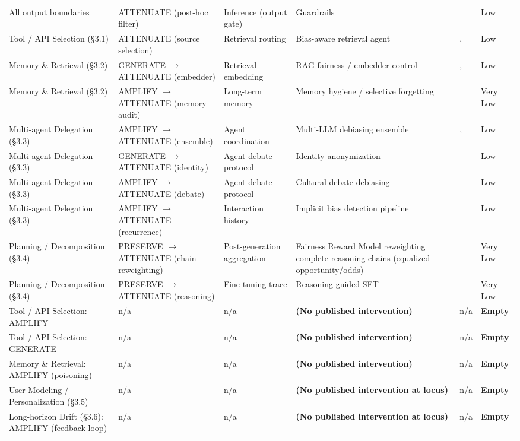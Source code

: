 \documentclass[acmsmall,nonacm]{acmart}
\begin{document}
\begin{longtable}{|p{}|p{}|p{}|p{}|p{}|p{}|}
All output boundaries & ATTENUATE (post-hoc filter) & Inference (output gate) & Guardrails & \cite{dong2024building} & Low \\
Tool / API Selection (\S{}3.1) & ATTENUATE (source selection) & Retrieval routing & Bias-aware retrieval agent & \cite{singh2025bias}, \cite{singh2025biasb} & Low \\
Memory \& Retrieval (\S{}3.2) & GENERATE $\rightarrow$ ATTENUATE (embedder) & Retrieval embedding & RAG fairness / embedder control & \cite{kim2024fair}, \cite{kim2025mitigating} & Low \\
Memory \& Retrieval (\S{}3.2) & AMPLIFY $\rightarrow$ ATTENUATE (memory audit) & Long-term memory & Memory hygiene / selective forgetting & \cite{ma2026implicit} & Very Low \\
Multi-agent Delegation (\S{}3.3) & AMPLIFY $\rightarrow$ ATTENUATE (ensemble) & Agent coordination & Multi-LLM debiasing ensemble & \cite{owens2024multi}, \cite{xu2024mitigating} & Low \\
Multi-agent Delegation (\S{}3.3) & GENERATE $\rightarrow$ ATTENUATE (identity) & Agent debate protocol & Identity anonymization & \cite{choi2025identity} & Low \\
Multi-agent Delegation (\S{}3.3) & AMPLIFY $\rightarrow$ ATTENUATE (debate) & Agent debate protocol & Cultural debate debiasing & \cite{ki2025multiple} & Low \\
Multi-agent Delegation (\S{}3.3) & AMPLIFY $\rightarrow$ ATTENUATE (recurrence) & Interaction history & Implicit bias detection pipeline & \cite{borah2024implicit} & Low \\
Planning / Decomposition (\S{}3.4) & PRESERVE $\rightarrow$ ATTENUATE (chain reweighting) & Post-generation aggregation & Fairness Reward Model reweighting complete reasoning chains (equalized opportunity/odds) & \cite{hall2025guiding} & Very Low \\
Planning / Decomposition (\S{}3.4) & PRESERVE $\rightarrow$ ATTENUATE (reasoning) & Fine-tuning trace & Reasoning-guided SFT & \cite{kabra2025reasoning} & Very Low \\
Tool / API Selection: AMPLIFY & n/a & n/a & \textbf{(No published intervention)} & n/a & \textbf{Empty} \\
Tool / API Selection: GENERATE & n/a & n/a & \textbf{(No published intervention)} & n/a & \textbf{Empty} \\
Memory \& Retrieval: AMPLIFY (poisoning) & n/a & n/a & \textbf{(No published intervention)} & n/a & \textbf{Empty} \\
User Modeling / Personalization (\S{}3.5) & n/a & n/a & \textbf{(No published intervention at locus)} & n/a & \textbf{Empty} \\
Long-horizon Drift (\S{}3.6): AMPLIFY (feedback loop) & n/a & n/a & \textbf{(No published intervention at locus)} & n/a & \textbf{Empty} \\
\end{longtable}
\endgroup
\end{document}
